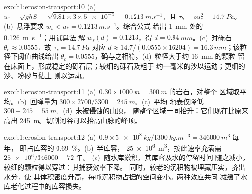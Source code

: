 \begin{solution}{exo:b1:erosion-transport:10}
(a)~$u_* = \sqrt{g h S} = \sqrt{9.81 \times 3 \times \num{5e-4}} =
\qty{0.1213}{m.s^{-1}}$，且 $\tau_b = \rho u_*^2 = \qty{14.7}{Pa}$。
(b)~悬浮要求 $w_s < u_* = \qty{0.1213}{m.s^{-1}}$。综合公式
给出 \qty{1}{mm} 处的 \qty{0.126}{m.s^{-1}}；用试算法
解 $w_s(d) = 0.1213$，得 $d = \qty{0.94}{mm}$。(c)~对砾石
$\theta_c \approx 0.0555$，故 $\tau_c = \qty{14.7}{Pa}$ 对应 $d \approx
14.7/(0.0555 \times 16204) = \qty{16.3}{mm}$；该粒径下阈值曲线给出
$\theta_c = 0.0555$，确与之相符。(d)~粒径大于约 \qty{16}{mm} 的颗粒
留在床面上，形成稳定的砾石层；较细的砾石及粗于
约一毫米的沙以运动；更细的沙、粉砂与黏土
则以运动。
\end{solution}

\begin{solution}{exo:b1:erosion-transport:11}
(a)~$0.30 \times \qty{1000}{m} = \qty{300}{m}$ 的岩石，对整个
区域取平均。(b)~回弹量为 $300 \times 2700/3300 = \qty{245}{m}$。(c)~平均
地表仅降低 $300 - 245 = \qty{55}{m}$。(d)~未被侵蚀的山顶，
随整个区域一同抬升：它们现在比原来
高出 \qty{245}{m}。切割河谷可以抬高山脉的峰顶。
\end{solution}

\begin{solution}{exo:b1:erosion-transport:12}
(a)~$0.9 \times \qty{5e8}{kg}/\qty{1300}{kg.m^{-3}} = \qty{346000}{m^3}$ 每年，
即占库容的 \qty{0.69}{\percent}。(b)~半库容，
\qty{25e6}{m^3}，按此速率充满需 $\num{25e6}/\num{346000} = \num{72}\text{ 年}$。
(c)~随水库淤积，其库容及水的停留时间
随之减小，较细的颗粒得以穿过：其捕获效率下降。
同时，较老的沉积物被埋藏压实，挤出水分，使
其体积密度升高，每吨沉积物占据的空间变小。两种效应共同
减缓了水库老化过程中的库容损失。
\end{solution}

